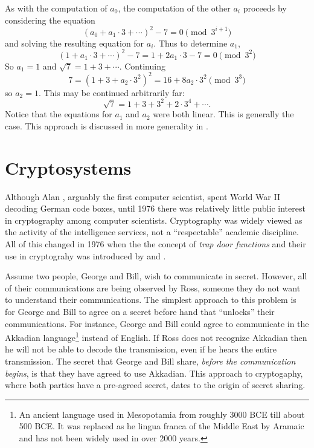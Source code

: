 As with the computation of $a_0$, the computation of the other $a_i$
proceeds by considering the equation
\[
(a_0 + a_1 \cdot 3 + \cdots)^2 - 7 = 0 \pmod{3^{i+1}}
\]
and solving the resulting equation for $a_i$.  Thus to determine
$a_1$,
\[
(1 + a_1 \cdot 3 + \cdots)^2 - 7 = 
   1 +2 a_1 \cdot 3 - 7 = 0 \pmod{3^2}
\]
So $a_1 = 1$ and $\sqrt{7} = 1 + 3 + \cdots.$
Continuing
\[
7 = (1+ 3+ a_2 \cdot 3^2)^2 = 16 + 8a_2 \cdot 3^2 \pmod{3^3}
\]
so $a_2 = 1$.  This may be continued arbitrarily far:
\[
\sqrt{7} = 1 + 3 + 3^2 + 2 \cdot 3^4 + \cdots.
\]
Notice that the equations for $a_1$ and $a_2$ were both linear.  This
is generally the case.  This approach is discussed in more generality
in .


\section{Cryptosystems}
\label{Crypto:Sec}

Although Alan {\Turing}, arguably the first
computer scientist, spent World War II decoding German code boxes,
until 1976 there was relatively little public interest in cryptography
among computer scientists.  Cryptography was widely viewed as the
activity of the intelligence services, not a ``respectable'' academic
discipline.  All of this changed in 1976 when the the concept of {\em trap
door functions} and their use in
cryptograhy was introduced by {\Diffie} and {\Hellman} \cite{Diffie76}.

Assume two people, George and Bill, wish to communicate in secret.
However, all of their communications are being observed by Ross,
someone they do not want to understand their communications.  The
simplest approach to this problem is for George and Bill to agree on a
secret before hand that ``unlocks'' their communications.  For
instance, George and Bill could agree to communicate in the
Akkadian language\footnote{An ancient language used in Mesopotamia from roughly
  3000 BCE till about 500 BCE. It was replaced as he lingua franca of
  the Middle East by Aramaic and has not been widely used in over 2000 years.}
instead of English.  If Ross does not recognize Akkadian then he will
not be able to decode the transmission, even if he hears the entire
transmission.  The secret that George and Bill share, {\em before the
communication begins\/}, is that they have agreed to use Akkadian.
This approach to cryptogaphy, where both parties have a pre-agreed
secret, dates to the origin of secret sharing. 

